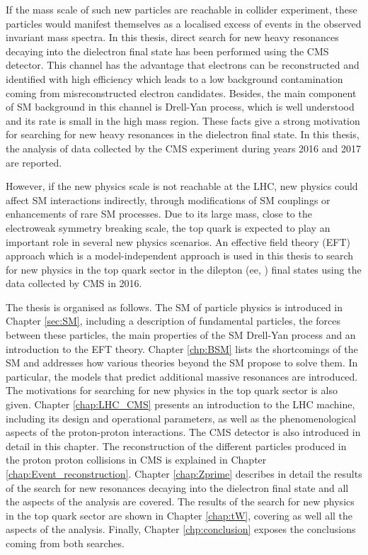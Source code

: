 If the mass scale of such new particles are reachable in collider experiment, these particles would manifest themselves as a localised excess of events in the observed invariant mass spectra. In this thesis, direct search for new heavy resonances decaying into the dielectron final state has been performed using the CMS detector. This channel has the advantage that electrons can be reconstructed and identified with high efficiency which leads to a low background contamination coming from misreconstructed electron candidates. Besides, the main component of SM background in this channel is Drell-Yan process, which is well understood and its rate is small in the high mass region. These facts give a strong motivation for searching for new heavy resonances in the dielectron final state. In this thesis, the analysis of data collected by the CMS experiment during years 2016 and 2017 are reported.

However, if the new physics scale is not reachable at the LHC, new physics could affect SM interactions indirectly, through modifications of SM couplings or enhancements of rare SM processes. Due to its large mass, close to the electroweak symmetry breaking scale, the top quark is expected to play an important role in several new physics scenarios. An effective field theory (EFT) approach which is a model-independent approach is used in this thesis to search for new physics in the top quark sector in the dilepton (ee, \mumu) final states using the data collected by CMS in 2016.


The thesis is organised as follows. The SM of particle physics is introduced in Chapter \ref{sec:SM}, including a description of fundamental particles, the forces between these particles, the main properties of the SM Drell-Yan process and an introduction to the EFT theory. Chapter \ref{chp:BSM} lists the shortcomings of the SM and addresses how various theories beyond the SM propose to solve them. In particular, the models that predict additional massive resonances are introduced. The motivations for searching for new physics in the top quark sector is also given. Chapter \ref{chap:LHC_CMS} presents an introduction to the LHC machine, including its design and operational parameters, as well as the phenomenological aspects of the proton-proton interactions. The CMS detector is also introduced in detail in this chapter. The reconstruction of the different particles produced in the proton proton collisions in CMS is explained in Chapter \ref{chap:Event_reconstruction}. Chapter \ref{chap:Zprime} describes in detail the results of the search for new resonances decaying into the dielectron final state and all the aspects of the analysis are covered. The results of the search for new physics in the top quark sector are shown in Chapter \ref{chap:tW}, covering as well all the aspects of the analysis. Finally, Chapter \ref{chp:conclusion} exposes the conclusions coming from both searches.


